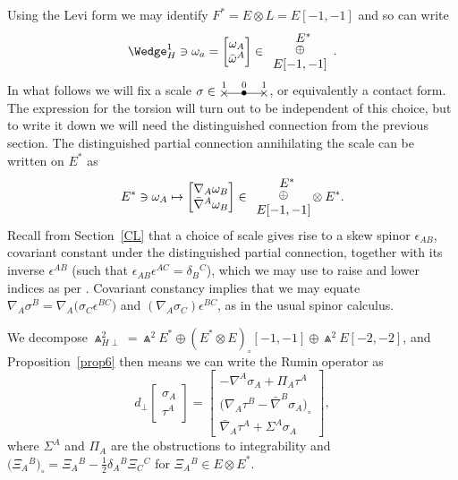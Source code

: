 \documentclass[pdftex]{sigma}%
\numberwithin{equation}{section}
\newcommand{\xox}[3]{\begin{picture}(40,11)
\put(4,1.5){\makebox(0,0){$\times$}}
\put(20,1.5){\makebox(0,0){$\bullet$}}
\put(36,1.5){\makebox(0,0){$\times$}}
\put(4,1.5){\line(1,0){32}}
\put(4,8){\makebox(0,0){$\scriptstyle #1$}}
\put(20,8){\makebox(0,0){$\scriptstyle #2$}}
\put(36,8){\makebox(0,0){$\scriptstyle #3$}}
\end{picture}}
\begin{document}
Using the Levi form we may identify $F^* = E \otimes L = E[-1,-1]$ and so
can write
\[\Wedge_H^1 \ni \omega_a = \begin{bmatrix} \omega_A \\ \bar{\omega}^A
\end{bmatrix} \in \begin{array}{c}
\hspace{2mm}E^*\\[-3pt] \oplus\\ E[-1,-1]\end{array}. \]
In what follows we will fix a scale $\sigma \in \xox{1}{0}{1}$, or equivalently
a contact form. The expression for the torsion will turn out to be independent
of this choice, but to write it down we will need the distinguished connection
from the previous section. The distinguished partial connection annihilating
the scale can be written on $E^*$ as
\[E^* \ni \omega_A \mapsto \begin{bmatrix} \nabla_A\omega_B \\
\bar{\nabla}^A\omega_B \end{bmatrix} \in \begin{array}{c}
\hspace{2mm}E^*\\[-3pt] \oplus\\ E[-1,-1] \end{array}
\hspace{-2mm} \otimes E^*.
\]
Recall from Section~\ref{CL} that a choice of scale gives rise to a skew spinor
$\epsilon_{AB}$, covariant constant under the distinguished partial connection,
together with its inverse $\epsilon^{AB}$ (such that
$\epsilon_{AB}\epsilon^{AC}=\delta_B{}^C$), which we may use to raise and lower
indices as per \cite{OT}. Covariant constancy implies that we may equate
$\nabla_A \sigma^B = \nabla_A\big(\sigma_C\epsilon^{BC}\big)$ and
$(\nabla_A\sigma_C)\epsilon^{BC}$, as in the usual spinor calculus.

We decompose $\Wedge_{H\perp}^2
= \Wedge^2E^* \oplus (E^* \otimes E)_\circ[-1,-1] \oplus \Wedge^2E[-2,-2]$,
and Proposition~\ref{prop6} then means we can write the Rumin operator as
\[d_\perp
\begin{bmatrix}
\sigma_A \\
\tau^A
\end{bmatrix} = \begin{bmatrix}
 -\nabla^A\sigma_A + \Pi_A\tau^A \\
\big(\nabla_A\tau^B - \bar{\nabla}^B\sigma_A\big)_\circ \\
 \bar{\nabla}_A\tau^A + \Sigma^A\sigma_A
\end{bmatrix},
\]
where $\Sigma^A$ and $\Pi_A$ are the obstructions to integrability and
$\big(\Xi_A{}^B\big)_\circ = \Xi_A{}^B - \frac{1}{2}\delta_A{}^B\Xi_C{}^C$
for $\Xi_A{}^B \in E \otimes E^*$.
\end{document}
